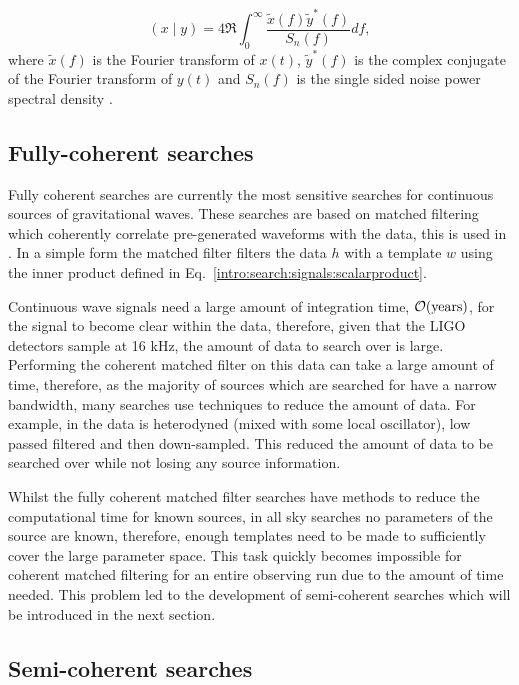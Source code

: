 \begin{equation}
\label{intro:search:signals:scalarproduct}
(x \mid y) = 4 \Re \int_{0}^{\infty} \frac{\tilde{x}(f)\tilde{y}^{*}(f)}{S_n(f)}df,
\end{equation}
where $\tilde{x}(f)$ is the Fourier transform of $x(t)$, $\tilde{y}^{*}(f)$ is the complex conjugate of the Fourier transform of $y(t)$ and $S_n(f)$ is the single sided noise power spectral density \citep{Prix2007}.

\subsection{\label{intro:search:coherent}Fully-coherent searches}

Fully coherent searches are currently the most sensitive searches for continuous sources of gravitational waves. These searches are based on matched filtering which coherently correlate pre-generated waveforms with the data, this is used in \citep{Dupuis2005,Jaranowski1998,}.
In a simple form the matched filter filters the data $h$ with a template $w$ using the inner product defined in Eq.~\ref{intro:search:signals:scalarproduct}. 

Continuous wave signals need a large amount of integration time, $\mathcal{O}(\rm{years})$, for the signal to become clear within the data, therefore, given that the \ac{LIGO} detectors sample at 16 kHz, the amount of data to search over is large. 
Performing the coherent matched filter on this data can take a large amount of time, therefore, as the majority of sources which are searched for have a narrow bandwidth, many searches use techniques to reduce the amount of data. 
For example, in \citep{Dupuis2005} the data is heterodyned (mixed with some local oscillator), low passed filtered and then down-sampled. This reduced the amount of data to be searched over while not losing any source information. 

Whilst the fully coherent matched filter searches have methods to reduce the computational time for known sources, in all sky searches no parameters of the source are known, therefore, enough templates need to be made to sufficiently cover the large parameter space. 
This task quickly becomes impossible for coherent matched filtering for an entire observing run due to the amount of time needed. This problem led to the development of semi-coherent searches which will be introduced in the next section. 

\subsection{\label{intro:search:semicoherent}Semi-coherent searches}

